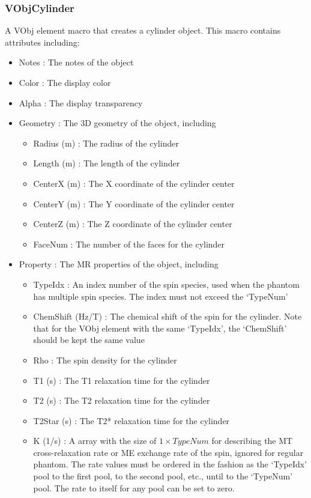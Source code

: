 \documentclass{book}%
\begin{document}
\subsubsection{VObjCylinder}

A VObj element macro that creates a cylinder object. This macro contains attributes including:

\begin{itemize}
	\item Notes : The notes of the object
	\item Color : The display color
	\item Alpha : The display transparency
	\item Geometry : The 3D geometry of the object, including
	\begin{itemize}
		\item Radius (m) : The radius of the cylinder
		\item Length (m) : The length of the cylinder
		\item CenterX (m) : The X coordinate of the cylinder center
		\item CenterY (m) : The Y coordinate of the cylinder center
		\item CenterZ (m) : The Z coordinate of the cylinder center
		\item FaceNum : The number of the faces for the cylinder
	\end{itemize}
	\item Property : The MR properties of the object, including
	\begin{itemize}
		\item TypeIdx : An index number of the spin species, used when the phantom has multiple spin species. The index must not exceed the `TypeNum'
		\item ChemShift (Hz/T) : The chemical shift of the spin for the cylinder. Note that for the VObj element with the same `TypeIdx', the `ChemShift' should be kept the same value
		\item Rho : The spin density for the cylinder
		\item T1 (s) : The T1 relaxation time for the cylinder
		\item T2 (s) : The T2 relaxation time for the cylinder
		\item T2Star (s) : The T2* relaxation time for the cylinder
		\item K (1/s) : A array with the size of $1 \times TypeNum$ for describing the MT cross-relaxation rate or ME exchange rate of the spin, ignored for regular phantom. The rate values must be ordered in the fashion as the `TypeIdx' pool to the first pool, to the second pool, etc., until to the `TypeNum' pool. The rate to itself for any pool can be set to zero.
	\end{itemize}
\end{itemize}
\end{document}
